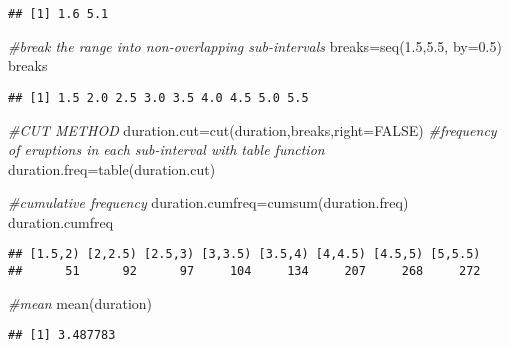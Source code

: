 \documentclass[
]{article}
\newenvironment{Shaded}{\begin{snugshade}}{\end{snugshade}}
\newcommand{\AttributeTok}[1]{\textcolor[rgb]{0.77,0.63,0.00}{#1}}
\newcommand{\CommentTok}[1]{\textcolor[rgb]{0.56,0.35,0.01}{\textit{#1}}}
\newcommand{\ConstantTok}[1]{\textcolor[rgb]{0.00,0.00,0.00}{#1}}
\newcommand{\FloatTok}[1]{\textcolor[rgb]{0.00,0.00,0.81}{#1}}
\newcommand{\FunctionTok}[1]{\textcolor[rgb]{0.00,0.00,0.00}{#1}}
\newcommand{\NormalTok}[1]{#1}
\newcommand{\OtherTok}[1]{\textcolor[rgb]{0.56,0.35,0.01}{#1}}
\begin{document}
\begin{verbatim}
## [1] 1.6 5.1
\end{verbatim}

\begin{Shaded}
\begin{Highlighting}[]
\CommentTok{\#break the range into non{-}overlapping sub{-}intervals}
\NormalTok{breaks}\OtherTok{=}\FunctionTok{seq}\NormalTok{(}\FloatTok{1.5}\NormalTok{,}\FloatTok{5.5}\NormalTok{, }\AttributeTok{by=}\FloatTok{0.5}\NormalTok{)}
\NormalTok{breaks}
\end{Highlighting}
\end{Shaded}

\begin{verbatim}
## [1] 1.5 2.0 2.5 3.0 3.5 4.0 4.5 5.0 5.5
\end{verbatim}

\begin{Shaded}
\begin{Highlighting}[]
\CommentTok{\#CUT METHOD}
\NormalTok{duration.cut}\OtherTok{=}\FunctionTok{cut}\NormalTok{(duration,breaks,}\AttributeTok{right=}\ConstantTok{FALSE}\NormalTok{)}
\CommentTok{\#frequency of eruptions in each sub{-}interval with table function}
\NormalTok{duration.freq}\OtherTok{=}\FunctionTok{table}\NormalTok{(duration.cut)}
\end{Highlighting}
\end{Shaded}

\begin{Shaded}
\begin{Highlighting}[]
\CommentTok{\#cumulative frequency}
\NormalTok{duration.cumfreq}\OtherTok{=}\FunctionTok{cumsum}\NormalTok{(duration.freq)}
\NormalTok{duration.cumfreq}
\end{Highlighting}
\end{Shaded}

\begin{verbatim}
## [1.5,2) [2,2.5) [2.5,3) [3,3.5) [3.5,4) [4,4.5) [4.5,5) [5,5.5) 
##      51      92      97     104     134     207     268     272
\end{verbatim}

\begin{Shaded}
\begin{Highlighting}[]
\CommentTok{\#mean}
\FunctionTok{mean}\NormalTok{(duration)}
\end{Highlighting}
\end{Shaded}

\begin{verbatim}
## [1] 3.487783
\end{verbatim}
\end{document}
